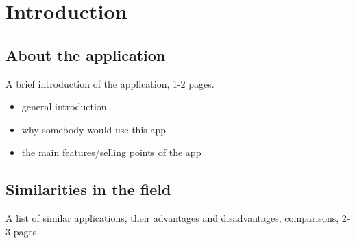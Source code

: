 \chapter{Introduction}\label{ch:INTRO}

\section{About the application}\label{sec:INTRO:about}
A brief introduction of the application, 1-2 pages.

\begin{itemize}
    \item general introduction
    \item why somebody would use this app
    \item the main features/selling points of the app
\end{itemize}

\section{Similarities in the field}\label{sec:INTRO:sa}

A list of similar applications, their advantages and disadvantages, comparisons, 2-3 pages.

